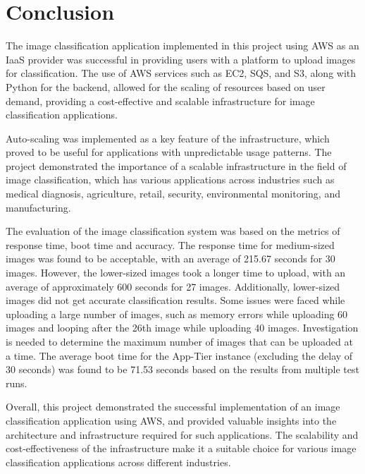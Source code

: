 \documentclass[../main.tex]{subfiles}
\begin{document}
\part*{Conclusion}

The image classification application implemented in this project using AWS as an IaaS provider was successful in providing users with a platform to upload images for classification. The use of AWS services such as EC2, SQS, and S3, along with Python for the backend, allowed for the scaling of resources based on user demand, providing a cost-effective and scalable infrastructure for image classification applications.

Auto-scaling was implemented as a key feature of the infrastructure, which proved to be useful for applications with unpredictable usage patterns. The project demonstrated the importance of a scalable infrastructure in the field of image classification, which has various applications across industries such as medical diagnosis, agriculture, retail, security, environmental monitoring, and manufacturing.

The evaluation of the image classification system was based on the metrics of response time, boot time and accuracy. The response time for medium-sized images was found to be acceptable, with an average of 215.67 seconds for 30 images. However, the lower-sized images took a longer time to upload, with an average of approximately 600 seconds for 27 images. Additionally, lower-sized images did not get accurate classification results. Some issues were faced while uploading a large number of images, such as memory errors while uploading 60 images and looping after the 26th image while uploading 40 images. Investigation is needed to determine the maximum number of images that can be uploaded at a time. The average boot time for the App-Tier instance (excluding the delay of 30 seconds) was found to be 71.53 seconds based on the results from multiple test runs.

Overall, this project demonstrated the successful implementation of an image classification application using AWS, and provided valuable insights into the architecture and infrastructure required for such applications. The scalability and cost-effectiveness of the infrastructure make it a suitable choice for various image classification applications across different industries.

\end{document}
